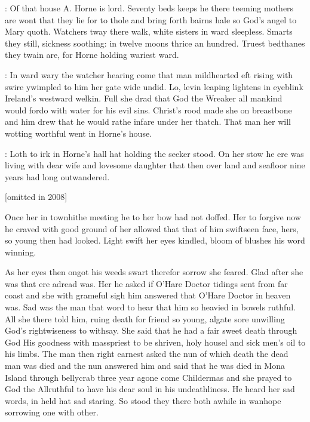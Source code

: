 \documentclass[12pt]{article}
\begin{document}

: Of that house A. Horne is lord. Seventy beds keeps he there teeming
mothers are wont that they lie for to thole and bring forth bairns hale so
God's angel to Mary quoth. Watchers tway there walk, white sisters in
ward sleepless.
Smarts they still, sickness soothing: in twelve moons
thrice an hundred. Truest bedthanes they twain are, for Horne holding
wariest ward.


: In ward wary the watcher hearing come that man mildhearted eft
rising with swire ywimpled to him her gate wide undid.
Lo, levin leaping
lightens in eyeblink Ireland's westward welkin. Full she drad that God the
Wreaker all mankind would fordo with water for his evil sins. Christ's
rood made she on breastbone and him drew that he would rathe infare under
her thatch. That man her will wotting worthful went in Horne's house.



: Loth to irk in Horne's hall hat holding the seeker stood. On her stow
he ere was living with dear wife and lovesome daughter that then over land
and seafloor nine years had long outwandered.

[omitted in 2008]

Once her in townhithe
meeting he to her bow had not doffed. Her to forgive now he craved with
good ground of her allowed that that of him swiftseen face, hers, so young
then had looked. Light swift her eyes kindled, bloom of blushes his word
winning.


As her eyes then ongot his weeds swart therefor sorrow she feared.
Glad after she was that ere adread was. Her he asked if O'Hare Doctor
tidings sent from far coast and she with grameful sigh him answered that
O'Hare Doctor in heaven was. Sad was the man that word to hear that him
so heavied in bowels ruthful. All she there told him, ruing death for
friend so young, algate sore unwilling God's rightwiseness to withsay. She
said that he had a fair sweet death through God His goodness with
masspriest to be shriven, holy housel and sick men's oil to his limbs. The
man then right earnest asked the nun of which death the dead man was died
and the nun answered him and said that he was died in Mona Island through
bellycrab three year agone come Childermas and she prayed to God the
Allruthful to have his dear soul in his undeathliness. He heard her sad
words, in held hat sad staring. So stood they there both awhile in wanhope
sorrowing one with other.
\end{document}
